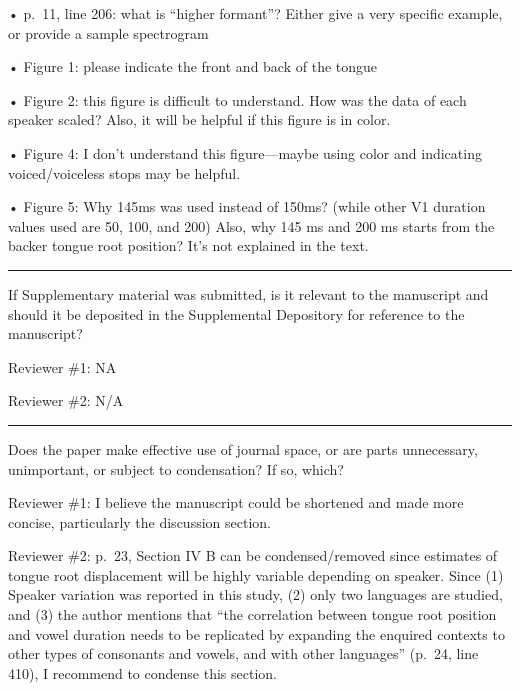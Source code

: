 \documentclass[]{article}
\begin{document}
• p.~11, line 206: what is ``higher formant''? Either give a very
specific example, or provide a sample spectrogram

• Figure 1: please indicate the front and back of the tongue

• Figure 2: this figure is difficult to understand. How was the data of
each speaker scaled? Also, it will be helpful if this figure is in
color.

• Figure 4: I don't understand this figure---maybe using color and
indicating voiced/voiceless stops may be helpful.

• Figure 5: Why 145ms was used instead of 150ms? (while other V1
duration values used are 50, 100, and 200) Also, why 145 ms and 200 ms
starts from the backer tongue root position? It's not explained in the
text.

\par

\noindent

\rule{\textwidth}{0.4pt}

If Supplementary material was submitted, is it relevant to the
manuscript and should it be deposited in the Supplemental Depository for
reference to the manuscript?

Reviewer \#1: NA

Reviewer \#2: N/A

\par

\noindent

\rule{\textwidth}{0.4pt}

Does the paper make effective use of journal space, or are parts
unnecessary, unimportant, or subject to condensation? If so, which?

Reviewer \#1: I believe the manuscript could be shortened and made more
concise, particularly the discussion section.

Reviewer \#2: p.~23, Section IV B can be condensed/removed since
estimates of tongue root displacement will be highly variable depending
on speaker. Since (1) Speaker variation was reported in this study, (2)
only two languages are studied, and (3) the author mentions that ``the
correlation between tongue root position and vowel duration needs to be
replicated by expanding the enquired contexts to other types of
consonants and vowels, and with other languages'' (p.~24, line 410), I
recommend to condense this section.

\par

\noindent
\end{document}
